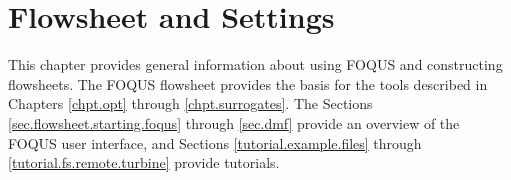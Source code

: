 \chapter{Flowsheet and Settings}\label{chpt.flowsheet}

This chapter provides general information about using FOQUS and constructing flowsheets. The FOQUS flowsheet provides the basis for the tools described in Chapters \ref{chpt.opt} through \ref{chpt.surrogates}. The Sections \ref{sec.flowsheet.starting.foqus} through \ref{sec.dmf} provide an overview of the FOQUS user interface, and Sections \ref{tutorial.example.files} through \ref{tutorial.fs.remote.turbine} provide tutorials.















